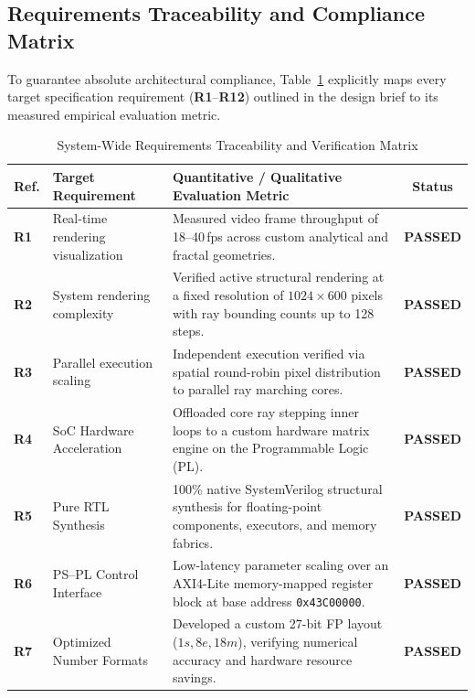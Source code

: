 \subsection{Requirements Traceability and Compliance Matrix}
\label{sec:requirements_matrix}
To guarantee absolute architectural compliance, Table~\ref{tab:requirements_validation} explicitly maps every target specification requirement (\textbf{R1}--\textbf{R12}) outlined in the design brief to its measured empirical evaluation metric.

\begin{table}[htbp]
\centering
\small
\renewcommand{\arraystretch}{1.2}
\caption{System-Wide Requirements Traceability and Verification Matrix}
\label{tab:requirements_validation}
\begin{tabularx}{\textwidth}{l|l|X|c}
\toprule
\textbf{Ref.} & \textbf{Target Requirement} & \textbf{Quantitative / Qualitative Evaluation Metric} & \textbf{Status} \\ 
\midrule
\textbf{R1} & Real-time rendering visualization & Measured video frame throughput of 18--40\,fps across custom analytical and fractal geometries. & \textbf{PASSED} \\ \hline
\textbf{R2} & System rendering complexity & Verified active structural rendering at a fixed resolution of $1024 \times 600$ pixels with ray bounding counts up to 128 steps. & \textbf{PASSED} \\ \hline
\textbf{R3} & Parallel execution scaling & Independent execution verified via spatial round-robin pixel distribution to parallel ray marching cores. & \textbf{PASSED} \\ \hline
\textbf{R4} & SoC Hardware Acceleration & Offloaded core ray stepping inner loops to a custom hardware matrix engine on the Programmable Logic (PL). & \textbf{PASSED} \\ \hline
\textbf{R5} & Pure RTL Synthesis & 100\% native SystemVerilog structural synthesis for floating-point components, executors, and memory fabrics. & \textbf{PASSED} \\ \hline
\textbf{R6} & PS--PL Control Interface & Low-latency parameter scaling over an AXI4-Lite memory-mapped register block at base address \texttt{0x43C00000}. & \textbf{PASSED} \\ \hline
\textbf{R7} & Optimized Number Formats & Developed a custom 27-bit FP layout ($1s, 8e, 18m$), verifying numerical accuracy and hardware resource savings. & \textbf{PASSED} \\ \hline

\end{tabularx}
\end{table}
